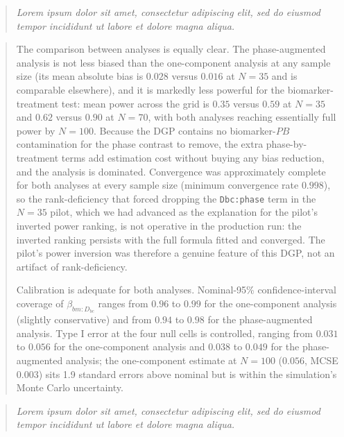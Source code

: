 \documentclass[
  11pt,
]{article}
\newenvironment{rgt}{%
  \begin{quote}\small\itshape\color[RGB]{20,60,160}}{%
  \end{quote}}
\newenvironment{orig}{%
  \begin{quote}\normalsize\color[gray]{0.55}}{%
  \end{quote}}
\begin{document}
\begin{rgt}
Lorem ipsum dolor sit amet, consectetur adipiscing elit, sed do eiusmod tempor incididunt ut labore et dolore magna aliqua.

\end{rgt}

\begin{orig}
The comparison between analyses is equally clear. The
phase-augmented analysis is not less biased than the one-component
analysis at any sample size (its mean absolute bias is \(0.028\)
versus \(0.016\) at \(N=35\) and is comparable elsewhere), and it is
markedly less powerful for the biomarker-treatment test: mean
power across the grid is \(0.35\) versus \(0.59\) at \(N=35\) and \(0.62\)
versus \(0.90\) at \(N=70\), with both analyses reaching essentially
full power by \(N=100\). Because the DGP contains no biomarker-\(PB\)
contamination for the phase contrast to remove, the extra
phase-by-treatment terms add estimation cost without buying any
bias reduction, and the analysis is dominated. Convergence was
approximately complete for both analyses at every sample size
(minimum convergence rate \(0.998\)), so the rank-deficiency that
forced dropping the \texttt{Dbc:phase} term in the \(N=35\) pilot,
which we had advanced as the explanation for the pilot's inverted
power ranking, is not operative in the production run: the inverted
ranking persists with the full formula fitted and converged. The
pilot's power inversion was therefore a genuine feature of this
DGP, not an artifact of rank-deficiency.

Calibration is adequate for both analyses. Nominal-95\%
confidence-interval coverage of \(\beta_{bm:D_{bc}}\) ranges from
\(0.96\) to \(0.99\) for the one-component analysis (slightly
conservative) and from \(0.94\) to \(0.98\) for the phase-augmented
analysis. Type I error at the four null cells is controlled,
ranging from \(0.031\) to \(0.056\) for the one-component analysis and
\(0.038\) to \(0.049\) for the phase-augmented analysis; the
one-component estimate at \(N=100\) (\(0.056\), MCSE \(0.003\)) sits
1.9 standard errors above nominal but is within the simulation's
Monte Carlo uncertainty.

\end{orig}

\begin{rgt}
Lorem ipsum dolor sit amet, consectetur adipiscing elit, sed do eiusmod tempor incididunt ut labore et dolore magna aliqua.

\end{rgt}
\end{document}
